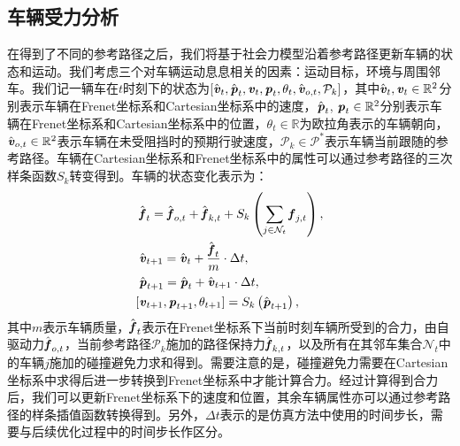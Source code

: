 \subsection{车辆受力分析}
\label{section:keyframe_forcesimulate}

在得到了不同的参考路径之后，我们将基于社会力模型沿着参考路径更新车辆的状态和运动。我们考虑三个对车辆运动息息相关的因素：运动目标，环境与周围邻车。我们记一辆车在$t$时刻下的状态为$[\hat{\textbf{\emph{v}}}_t, \hat{\textbf{\emph{p}}}_t, \textbf{\emph{v}}_t, \textbf{\emph{p}}_t, \theta_t, \hat{\textbf{\emph{v}}}_{o,t}, \mathcal{P}_{k}]$，其中$\hat{\textbf{\emph{v}}}_t, \textbf{\emph{v}}_t\in\mathbb{R}^2$分别表示车辆在Frenet坐标系和Cartesian坐标系中的速度，$\hat{\textbf{\emph{p}}}_t$,  $\textbf{\emph{p}}_t\in\mathbb{R}^2$分别表示车辆在Frenet坐标系和Cartesian坐标系中的位置，$\theta_t\in\mathbb{R}$为欧拉角表示的车辆朝向，$\hat{\textbf{\emph{v}}}_{o,t}\in\mathbb{R}^2$表示车辆在未受阻挡时的预期行驶速度，$\mathcal{P}_{k}\in\mathcal{P}^*$表示车辆当前跟随的参考路径。车辆在Cartesian坐标系和Frenet坐标系中的属性可以通过参考路径的三次样条函数$S_k$转变得到。车辆的状态变化表示为：
\begin{equation}
\setlength\abovedisplayskip{6pt}
\setlength\belowdisplayskip{6pt}
\label{eq:keyframe_dynamics}
\begin{aligned}
    & \hat{\textbf{\emph{f}}}_{t} = \hat{\textbf{\emph{f}}}_{o,t} + \hat{\textbf{\emph{f}}}_{k,t} + S_k \left( \sum_{j\in \mathcal{N}_{t}}{\textbf{\emph{f}}}_{j,t} \right), \\
    & \hat{\textbf{\emph{v}}}_{t+1} = \hat{\textbf{\emph{v}}}_t + \frac{\hat{\textbf{\emph{f}}}_{t}}{m} \cdot \Delta{t}, \\
    & \hat{\textbf{\emph{p}}}_{t+1} = \hat{\textbf{\emph{p}}}_t + \hat{\textbf{\emph{v}}}_{t+1} \cdot \Delta{t}, \\
    [ & \textbf{\emph{v}}_{t+1}, \textbf{\emph{p}}_{t+1}, \theta_{t+1}] = S_k\left( \hat{\textbf{\emph{p}}}_{t+1} \right), 
\end{aligned}
\end{equation}
其中$m$表示车辆质量，$\hat{\textbf{\emph{f}}}_{t}$表示在Frenet坐标系下当前时刻车辆所受到的合力，由自驱动力$\hat{\textbf{\emph{f}}}_{o,t}$，当前参考路径$\mathcal{P}_k$施加的路径保持力$\hat{\textbf{\emph{f}}}_{k,t}$，以及所有在其邻车集合$\mathcal{N}_{t}$中的车辆$j$施加的碰撞避免力求和得到。需要注意的是，碰撞避免力需要在Cartesian坐标系中求得后进一步转换到Frenet坐标系中才能计算合力。经过计算得到合力后，我们可以更新Frenet坐标系下的速度和位置，其余车辆属性亦可以通过参考路径的样条插值函数转换得到。另外，$\Delta{t}$表示的是仿真方法中使用的时间步长，需要与后续优化过程中的时间步长作区分。

